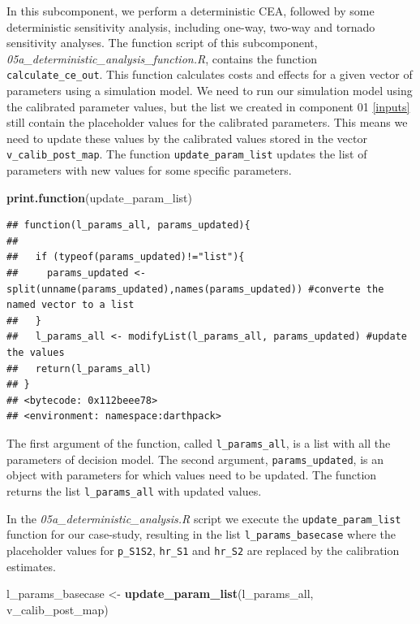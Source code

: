 \documentclass[]{book}
\newenvironment{Shaded}{\begin{snugshade}}{\end{snugshade}}
\newcommand{\KeywordTok}[1]{\textcolor[rgb]{0.13,0.29,0.53}{\textbf{#1}}}
\newcommand{\StringTok}[1]{\textcolor[rgb]{0.31,0.60,0.02}{#1}}
\newcommand{\NormalTok}[1]{#1}
\begin{document}
In this subcomponent, we perform a deterministic CEA, followed by some
deterministic sensitivity analysis, including one-way, two-way and
tornado sensitivity analyses. The function script of this subcomponent,
\emph{05a\_deterministic\_analysis\_function.R}, contains the function
\texttt{calculate\_ce\_out}. This function calculates costs and effects
for a given vector of parameters using a simulation model. We need to
run our simulation model using the calibrated parameter values, but the
list we created in component 01 \ref{inputs} still contain the
placeholder values for the calibrated parameters. This means we need to
update these values by the calibrated values stored in the vector
\texttt{v\_calib\_post\_map}. The function \texttt{update\_param\_list}
updates the list of parameters with new values for some specific
parameters.

\begin{Shaded}
\begin{Highlighting}[]
\KeywordTok{print.function}\NormalTok{(update_param_list)}
\end{Highlighting}
\end{Shaded}

\begin{verbatim}
## function(l_params_all, params_updated){
## 
##   if (typeof(params_updated)!="list"){
##     params_updated <- split(unname(params_updated),names(params_updated)) #converte the named vector to a list
##   }
##   l_params_all <- modifyList(l_params_all, params_updated) #update the values
##   return(l_params_all)
## }
## <bytecode: 0x112beee78>
## <environment: namespace:darthpack>
\end{verbatim}

The first argument of the function, called \texttt{l\_params\_all}, is a
list with all the parameters of decision model. The second argument,
\texttt{params\_updated}, is an object with parameters for which values
need to be updated. The function returns the list
\texttt{l\_params\_all} with updated values.

In the \emph{05a\_deterministic\_analysis.R} script we execute the
\texttt{update\_param\_list} function for our case-study, resulting in
the list \texttt{l\_params\_basecase} where the placeholder values for
\texttt{p\_S1S2}, \texttt{hr\_S1} and \texttt{hr\_S2} are replaced by
the calibration estimates.

\begin{Shaded}
\begin{Highlighting}[]
\NormalTok{l_params_basecase <-}\StringTok{ }\KeywordTok{update_param_list}\NormalTok{(l_params_all, v_calib_post_map) }
\end{Highlighting}
\end{Shaded}
\end{document}
